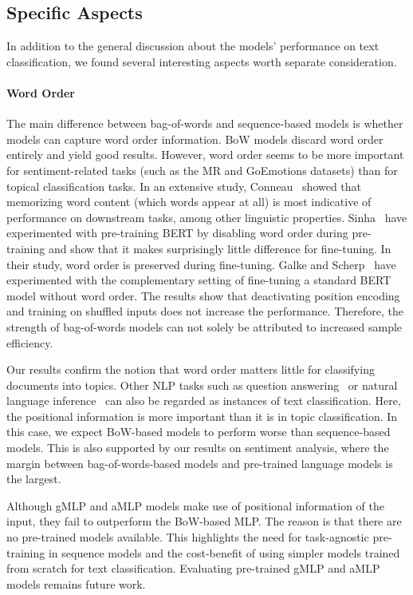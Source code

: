 \subsection{Specific Aspects}

In addition to the general discussion about the models' performance on text classification, we found several interesting aspects worth separate consideration.

\paragraph{Word Order}
The main difference between bag-of-words and sequence-based models is whether models can capture word order information.
BoW models discard word order entirely and yield good results. However, word order seems to be more important for sentiment-related tasks (such as the MR and GoEmotions datasets) than for topical classification tasks.
In an extensive study, Conneau~\etal\cite{DBLP:conf/acl/BaroniBLKC18} showed that memorizing word content (which words appear at all) is most indicative of performance on downstream tasks, among other linguistic properties.
Sinha~\etal\cite{sinha2021masked} have experimented with pre-training BERT by disabling word order during pre-training and show that it makes surprisingly little difference for fine-tuning. 
In their study, word order is preserved during fine-tuning. 
Galke and Scherp~\cite{galkescherp-acl2022} have experimented with the complementary setting of fine-tuning a standard BERT model without word order. The results show that deactivating position encoding and training on shuffled inputs does not increase the performance. Therefore, the strength of bag-of-words models can not solely be attributed to increased sample efficiency.

Our results confirm the notion that word order matters little for classifying documents into topics.
Other NLP tasks such as question answering~\cite{DBLP:conf/emnlp/RajpurkarZLL16} or natural language inference~\cite{DBLP:conf/iclr/WangSMHLB19} can also be regarded as instances of text classification. Here, the positional information is more important than it is in topic classification. In this case, we expect BoW-based models to perform worse than sequence-based models. This is also supported by our results on sentiment analysis, where the margin between bag-of-words-based models and pre-trained language models is the largest.

Although gMLP and aMLP models make use of positional information of the input, they fail to outperform the BoW-based MLP. 
The reason is that there are no pre-trained models available.
This highlights the need for task-agnostic pre-training in sequence models and the cost-benefit of using simpler models trained from scratch for text classification.
Evaluating pre-trained gMLP and aMLP models remains future work. 

